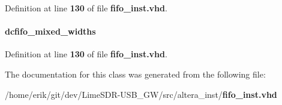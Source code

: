 Definition at line {\bf 130} of file {\bf fifo\+\_\+inst.\+vhd}.

\paragraph[{dcfifo\+\_\+mixed\+\_\+widths\+\_\+component}]{ {\bfseries \textcolor{vhdlchar}{dcfifo\+\_\+mixed\+\_\+widths}\textcolor{vhdlchar}{ }} \hspace{0.3cm}{\ttfamily [Instantiation]}}\label{classfifo__inst_1_1arch_a26bb08bead295960c5a436842e8db123}


Definition at line {\bf 130} of file {\bf fifo\+\_\+inst.\+vhd}.



The documentation for this class was generated from the following file\+:\begin{DoxyCompactItemize}
\item 
/home/erik/git/dev/\+Lime\+S\+D\+R-\/\+U\+S\+B\+\_\+\+G\+W/src/altera\+\_\+inst/{\bf fifo\+\_\+inst.\+vhd}\end{DoxyCompactItemize}
